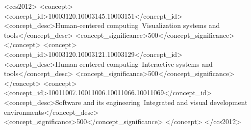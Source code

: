 \documentclass[sigconf,screen,pbalance=true]{acmart}
\begin{document}
\renewcommand{\shortauthors}{Kavalar, Markovics, Rusher}

\begin{abstract}
Clerk is an open source Clojure programmer's assistant that builds upon the traditions of interactive and literate programming to provide a holistic moldable development environment. Clerk layers static analysis, incremental computation, and rich browser-based graphical presentations on top of a Clojure programmer\textquotesingle s familiar toolkit to enhance their workflow.
\end{abstract}

\begin{CCSXML}
<ccs2012>
<concept>
<concept_id>10003120.10003145.10003151</concept_id>
<concept_desc>Human-centered computing~Visualization systems and tools</concept_desc>
<concept_significance>500</concept_significance>
</concept>
<concept>
<concept_id>10003120.10003121.10003129</concept_id>
<concept_desc>Human-centered computing~Interactive systems and tools</concept_desc>
<concept_significance>500</concept_significance>
</concept>
<concept>
<concept_id>10011007.10011006.10011066.10011069</concept_id>
<concept_desc>Software and its engineering~Integrated and visual development environments</concept_desc>
<concept_significance>500</concept_significance>
</concept>
</ccs2012>
\end{CCSXML}



%
\end{document}
